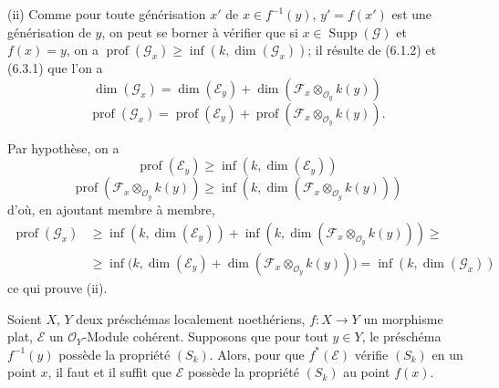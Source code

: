 
(ii) Comme pour toute générisation $x'$ de $x\in f^{-1}(y)$,
$y'=f(x')$ est une générisation de $y$, on peut se borner à vérifier que si
$x\in\operatorname{Supp}(\mathscr G)$ et $f(x)=y$, on a
$\operatorname{prof}(\mathscr G_x)\geq\inf(k,\dim(\mathscr G_x))$; il résulte
de (6.1.2) et (6.3.1) que l'on a
\[
\dim(\mathscr G_x)=\dim(\mathscr E_y)+
\dim(\mathscr F_x\otimes_{\mathcal O_y}k(y))
\]
\[
\operatorname{prof}(\mathscr G_x)=\operatorname{prof}(\mathscr E_y)+
\operatorname{prof}(\mathscr F_x\otimes_{\mathcal O_y}k(y)).
\]

Par hypothèse, on a
\[
\operatorname{prof}(\mathscr E_y)\geq\inf(k,\dim(\mathscr E_y))
\]
\[
\operatorname{prof}(\mathscr F_x\otimes_{\mathcal O_y}k(y))
\geq\inf(k,\dim(\mathscr F_x\otimes_{\mathcal O_y}k(y)))
\]
d'où, en ajoutant membre à membre,
\begin{align*}
\operatorname{prof}(\mathscr G_x)
&\geq\inf(k,\dim(\mathscr E_y))
+\inf(k,\dim(\mathscr F_x\otimes_{\mathcal O_y}k(y)))\geq{}\\
&\geq\inf\bigl(k,\dim(\mathscr E_y)
+\dim(\mathscr F_x\otimes_{\mathcal O_y}k(y))\bigr)
=\inf(k,\dim(\mathscr G_x))
\end{align*}
ce qui prouve (ii).

\begin{corollary}[6.4.2]
\label{IV.2.s6.4.2-fr}
Soient $X$, $Y$ deux préschémas localement noethériens, $f:X\to Y$ un
morphisme plat, $\mathscr E$ un $\mathcal O_Y$-Module cohérent. Supposons que
pour tout $y\in Y$, le préschéma $f^{-1}(y)$ possède la propriété $(S_k)$.
Alors, pour que $f^*(\mathscr E)$ vérifie $(S_k)$ en un point $x$, il faut et
il suffit que $\mathscr E$ possède la propriété $(S_k)$ au point $f(x)$.
\end{corollary}

